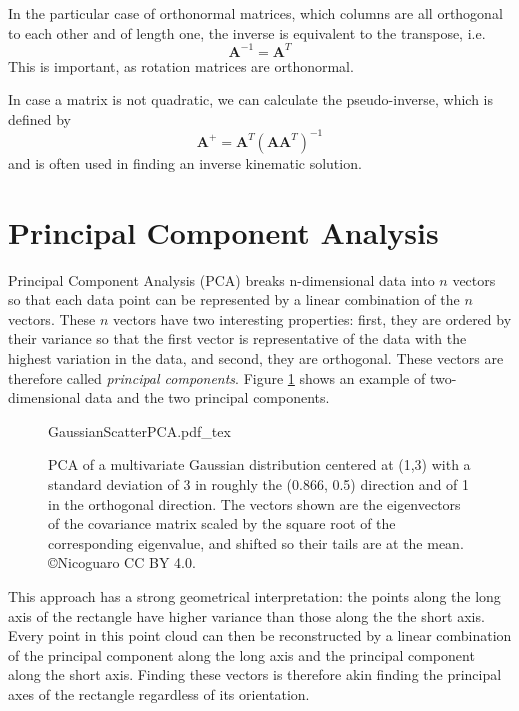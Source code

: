 In the particular case of orthonormal matrices, which columns are all orthogonal to each other and of length one, the inverse is equivalent to the transpose, i.e.
\begin{equation}
\mathbf{A}^{-1}=\mathbf{A}^T
\end{equation}
This is important, as rotation matrices are orthonormal.

In case a matrix is not quadratic, we can calculate the pseudo-inverse, which is defined by
\begin{equation}
\mathbf{A}^+=\mathbf{A}^T(\mathbf{AA}^T)^{-1}
\end{equation}
and is often used in finding an inverse kinematic solution.

\section{Principal Component Analysis}\label{sec:appendix_PCA}
Principal Component Analysis (PCA) breaks n-dimensional data into $n$ vectors so that each data point can be represented by a linear combination of the $n$ vectors. These $n$ vectors have two interesting properties: first, they are ordered by their variance so that the first vector is representative of the data with the highest variation in the data, and second, they are orthogonal. These vectors are therefore called \emph{principal components}. Figure \ref{fig:PCA} shows an example of two-dimensional data and the two principal components. 


\begin{figure}[htb]
    \centering
    \def\svgwidth{0.8\textwidth}
    {GaussianScatterPCA.pdf_tex}
    \caption{PCA of a multivariate Gaussian distribution centered at (1,3) with a standard deviation of 3 in roughly the (0.866, 0.5) direction and of 1 in the orthogonal direction. The vectors shown are the eigenvectors of the covariance matrix scaled by the square root of the corresponding eigenvalue, and shifted so their tails are at the mean. \copyright Nicoguaro CC BY 4.0.\label{fig:PCA}}
\end{figure}

This approach has a strong geometrical interpretation: the points along the long axis of the rectangle have higher variance than those along the the short axis. Every point in this point cloud can then be reconstructed by a linear combination of the principal component along the long axis and the principal component along the short axis. Finding these vectors is therefore akin finding the principal axes of the rectangle regardless of its orientation.

